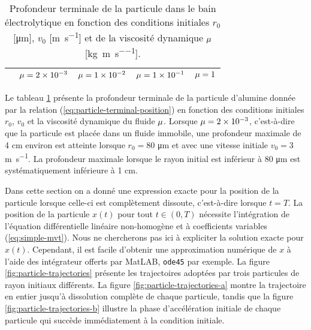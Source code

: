 \begin{table}
  \begin{center}
    \caption{Profondeur terminale de la particule dans le bain
      électrolytique en fonction des conditions initiales $r_0$
      [\si{\micro\meter}], $v_0$ [\si{\meter\per\second}] et de la
      viscosité dynamique $\mu$
      [\si{\kilo\gram\per\meter\per\second}].}
    \label{tab:fall-results}
    \begin{tabularx}{\textwidth}{@{}lXXXX@{}}
      \toprule
      & $\mu = \num{2e-3}$ & $\mu = \num{1e-2}$ & $\mu = \num{1e-1}$ & $\mu = \num{1}$ \\
      \midrule
      
      \bottomrule
    \end{tabularx}
  \end{center}
\end{table}

Le tableau \ref{tab:fall-results} présente la profondeur
terminale de la particule d'alumine donnée par la relation
(\ref{eq:particle-terminal-position}) en fonction des conditions
initiales $r_0$, $v_0$ et la viscosité dynamique du fluide
$\mu$. Lorsque $\mu =
\num{2e-3}$, c'est-à-dire que la particule est placée dans un fluide
immobile, une profondeur maximale de \num{4} \si{\centi\meter}
environ est atteinte lorsque $r_0 = \num{80}$ \si{\micro\meter} et
avec une vitesse initiale $v_0 = \num{3}$ \si{\meter\per\second}. La
profondeur maximale lorsque le rayon initial est inférieur à
\num{80} \si{\micro\meter} est systématiquement inférieure à
\num{1} \si{\centi\meter}.

Dans cette section on a donné une expression exacte pour la position
de la particule lorsque celle-ci est complètement dissoute,
c'est-à-dire lorsque $t = T$. La position de la particule
$x(t)$ pour tout $t \in(0, T)$ nécessite l'intégration de l'équation
différentielle linéaire non-homogène et à coefficients variables
(\ref{eq:simple-mvt}). Nous ne chercherons pas ici à expliciter la
solution exacte pour $x(t)$. Cependant, il est facile d'obtenir une
approximation numérique de $x$ à l'aide des intégrateur offerts par
MatLAB\textregistered, \texttt{ode45} par exemple. La figure
\ref{fig:particle-trajectories} présente les trajectoires adoptées
par trois particules de rayon initiaux différents. La figure
\ref{fig:particle-trajectories-a} montre la trajectoire en entier
jusqu'à dissolution complète de chaque particule, tandis que la
figure \ref{fig:particle-trajectories-b} illustre la phase
d'accélération initiale de chaque particule qui succède
immédiatement à la condition initiale.

